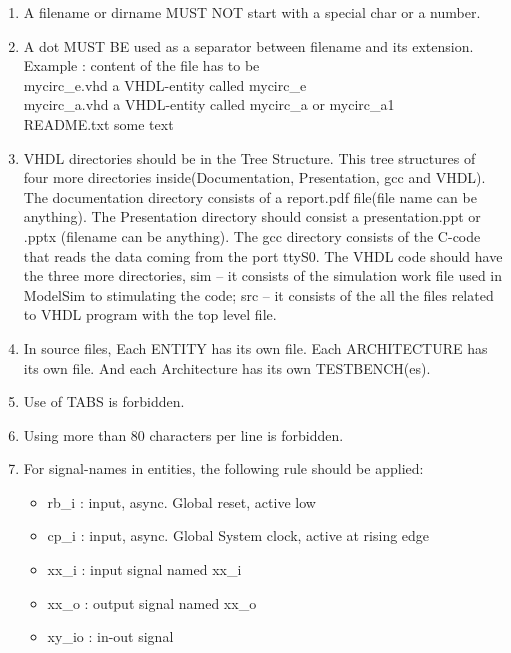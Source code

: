 \documentclass[12pt,a4paper]{article}
\begin{document}
\begin{enumerate}


\item A filename or dirname MUST NOT start with a special char or a number. \
\item A dot MUST BE used as a separator between filename and its extension.\\
	Example :     \hspace{1cm} content of the file has to be\\
	mycirc\_e.vhd \hspace{1cm} a VHDL-entity called mycirc\_e\\
	mycirc\_a.vhd \hspace{1cm} a VHDL-entity called mycirc\_a or mycirc\_a1\\
	README.txt    \hspace{1cm} some text\\

\item VHDL directories should be in the Tree Structure. This tree structures of four more directories inside(Documentation, Presentation, gcc and VHDL). The documentation directory consists of a report.pdf file(file name can be anything). The Presentation directory should consist a presentation.ppt or .pptx (filename can be anything). The gcc directory consists of the C-code that reads the data coming from the port ttyS0. The VHDL code should have the three more directories, sim – it consists of the simulation work file used in ModelSim to stimulating the code; src – it consists of the all the files related to VHDL program with the top level file.\

\item In source files, Each ENTITY has its own file. Each ARCHITECTURE has its own file. And each Architecture has its own TESTBENCH(es).\
\item Use of TABS is forbidden.\
\item Using more than 80 characters per line is forbidden.\ 
\item For signal-names in entities, the following rule should be applied:\
\begin{itemize}
\item rb\_i \hspace{1cm} 	: input, async. Global reset, active low\
\item cp\_i \hspace{1cm}  	: input, async. Global System clock, active at rising edge \
\item xx\_i \hspace{1cm}  	: input signal named xx\_i\
\item xx\_o \hspace{1cm}    : output signal named xx\_o\
\item xy\_io\hspace{1cm} 	: in-out signal\
\end{itemize}


\end{enumerate}
\end{document}
